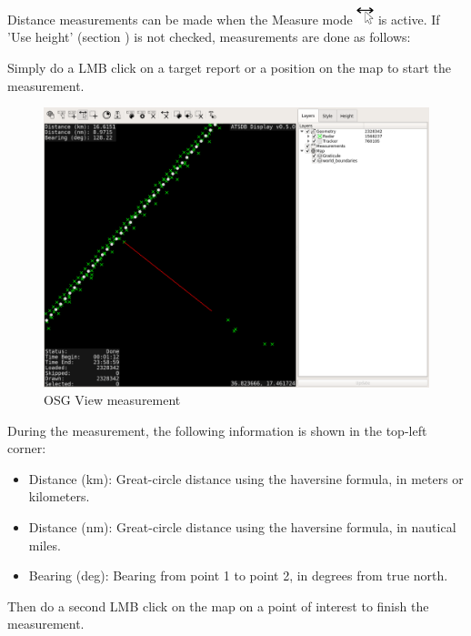 Distance measurements can be made when the Measure mode \includegraphics[width=0.5cm,frame]{../../data/icons/measure_action.png} is active. If 'Use height' (section ) is not checked, measurements are done as follows:

Simply do a LMB click on a target report or a position on the map to start the measurement.

\begin{figure}[H]
    \hspace*{-2.5cm}
    \includegraphics[width=19cm,frame]{figures/osgview_measure1.png}
  \caption{OSG View measurement}
\end{figure}

During the measurement, the following information is shown in the top-left corner:

\begin{itemize}
 \item Distance (km): Great-circle distance using the haversine formula, in meters or kilometers.
 \item Distance (nm): Great-circle distance using the haversine formula, in nautical miles.
 \item  Bearing (deg): Bearing from point 1 to point 2, in degrees from true north.
\end{itemize}

Then do a second LMB click on the map on a point of interest to finish the measurement.

